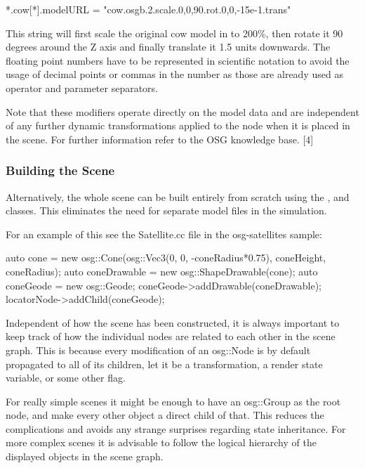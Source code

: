 \begin{inifile}
*.cow[*].modelURL = "cow.osgb.2.scale.0,0,90.rot.0,0,-15e-1.trans"
\end{inifile}

This string will first scale the original cow model in  to
200\%, then rotate it 90 degrees around the Z axis and finally translate it
1.5 units downwards. The floating point numbers have to be represented in
scientific notation to avoid the usage of decimal points or commas in the
number as those are already used as operator and parameter separators.

Note that these modifiers operate directly on the model data and are
independent of any further dynamic transformations applied to the node when
it is placed in the scene. For further information refer to the OSG
knowledge base. [4]

\subsubsection{Building the Scene}

Alternatively, the whole scene can be built entirely from scratch using the
,  and 
classes. This eliminates the need for separate model files in the
simulation.

For an example of this see the Satellite.cc file in the osg-satellites
sample:

\begin{cpp}
auto cone = new osg::Cone(osg::Vec3(0, 0, -coneRadius*0.75), coneHeight, coneRadius);
auto coneDrawable = new osg::ShapeDrawable(cone);
auto coneGeode = new osg::Geode;
coneGeode->addDrawable(coneDrawable);
locatorNode->addChild(coneGeode);
\end{cpp}

Independent of how the scene has been constructed, it is always important
to keep track of how the individual nodes are related to each other in the
scene graph. This is because every modification of an osg::Node is by
default propagated to all of its children, let it be a transformation, a
render state variable, or some other flag.

For really simple scenes it might be enough to have an osg::Group as the
root node, and make every other object a direct child of that. This reduces
the complications and avoids any strange surprises regarding state
inheritance. For more complex scenes it is advisable to follow the logical
hierarchy of the displayed objects in the scene graph.

